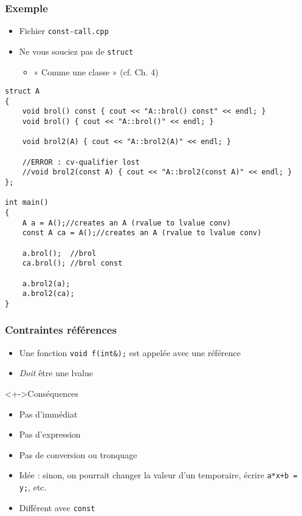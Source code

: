 \begin{frame}[containsverbatim]
\frametitle{Exemple}
\begin{itemize}
\item Fichier \texttt{const-call.cpp}
\item Ne vous souciez pas de \lstinline|struct|
	\begin{itemize}
	\item « Comme une classe » (cf. Ch. 4)
	\end{itemize}
\end{itemize}
\begin{lstlisting}
struct A
{
    void brol() const { cout << "A::brol() const" << endl; }
    void brol() { cout << "A::brol()" << endl; }

    void brol2(A) { cout << "A::brol2(A)" << endl; }
    
    //ERROR : cv-qualifier lost
    //void brol2(const A) { cout << "A::brol2(const A)" << endl; } 
};

int main()
{
    A a = A();//creates an A (rvalue to lvalue conv)
    const A ca = A();//creates an A (rvalue to lvalue conv)

    a.brol();  //brol
    ca.brol(); //brol const

    a.brol2(a);
    a.brol2(ca);
}
\end{lstlisting}
\end{frame}

\begin{frame}
\frametitle{Contraintes références}
\begin{itemize}[<+->]
\item Une fonction \lstinline|void f(int&);| est appelée avec une référence
\item \emph{Doit} être une lvalue
\end{itemize}
\begin{alertblock}<+->{Conséquences}
	\begin{itemize}[<+->]
	\item Pas d'immédiat
	\item Pas d'expression
	\item Pas de conversion ou tronquage
	\end{itemize}
\end{alertblock}
\begin{itemize}[<+->]
\item Idée : sinon, on pourrait changer la valeur d'un temporaire, écrire \texttt{a*x+b = y;}, etc.
\item Différent avec \lstinline|const|
\end{itemize}
\end{frame}

